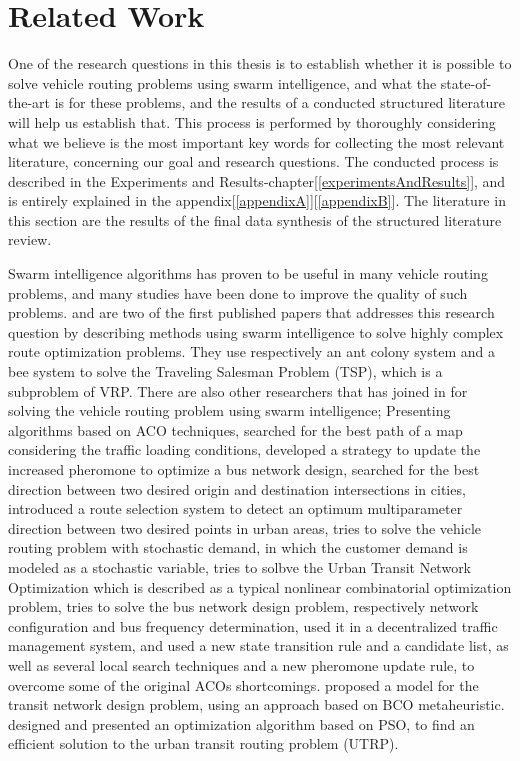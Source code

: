 \section{Related Work} 
One of the research questions in this thesis is to establish whether it is possible to solve vehicle routing problems using swarm intelligence, and what the state-of-the-art is for these problems, and the results of a conducted structured literature will help us establish that. This process is performed by thoroughly considering what we believe is the most important key words for collecting the most relevant literature, concerning our goal and research questions. The conducted process is described in the Experiments and Results-chapter[\ref{experimentsAndResults}], and is entirely explained in the appendix[\ref{appendixA}][\ref{appendixB}]. The literature in this section are the results of the final data synthesis of the structured literature review. 

Swarm intelligence algorithms has proven to be useful in many vehicle routing problems, and many studies have been done to improve the quality of such problems. \citet{dorigo97} and \citet{lucic03} are two of the first published papers that addresses this research question by describing methods using swarm intelligence to solve highly complex route optimization problems. They use respectively an ant colony system and a bee system to solve the Traveling Salesman Problem (TSP), which is a subproblem of VRP. There are also other researchers that has joined in for solving the vehicle routing problem using swarm intelligence; %
Presenting algorithms based on ACO techniques, \citet{hsiao04} searched for the best path of a map considering the traffic loading conditions, \citet{yang07} developed a strategy to update the increased pheromone to optimize a bus network design, \citet{salehi-nezhad07} searched for the best direction between two desired origin and destination intersections in cities, \citet{salehinejad10} introduced a route selection system to detect an optimum multiparameter direction between two desired points in urban areas, \citet{tripathi09} tries to solve the vehicle routing problem with stochastic demand, in which the customer demand is modeled as a stochastic variable, \citet{jiang10} tries to solbve the Urban Transit Network Optimization which is described as a typical nonlinear combinatorial optimization problem, \citet{poorzahedy11} tries to solve the bus network design problem, respectively network configuration and bus frequency determination, \citet{dias14} used it in a decentralized traffic management system, and \citet{sedighpour14} used a new state transition rule and a candidate list, as well as several local search techniques and a new pheromone update rule, to overcome some of the original ACOs shortcomings.  \citet{nikolic14} proposed a model for the transit network design problem, using an approach based on BCO metaheuristic. \citet{kechagiopoulos14} designed and presented an optimization algorithm based on PSO, to find an efficient solution to the urban transit routing problem (UTRP). 

